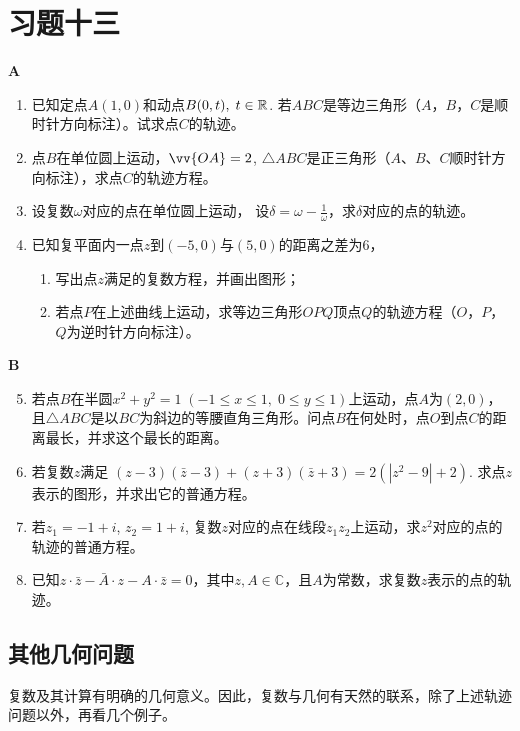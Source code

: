 \section*{习题十三}
\begin{center}
    \bfseries A
\end{center}
\begin{enumerate}
    \item 已知定点$A(1,0)$和动点$B(0,t),\; t\in\mathbb{R}$. 若$ABC$是等边三角形（$A$，$B$，$C$是顺时针方向标注）。试求点$C$的轨迹。
    \item 点$B$在单位圆上运动，$\vv{OA}=2$, $\triangle ABC$是正三角形（$A$、$B$、$C$顺时针方向标注），求点$C$的轨迹方程。
    \item 设复数$\omega$对应的点在单位圆上运动，
    设$\delta =\omega-\frac{1}{\omega}$，求$\delta$对应的点的轨迹。
   \item 已知复平面内一点$z$到$(-5,0)$与$(5,0)$的距离之差为6，
   \begin{enumerate}[(1)]
   \item 写出点$z$满足的复数方程，并画出图形；
   \item 若点$P$在上述曲线上运动，求等边三角形$OPQ$顶点$Q$的轨迹方程（$O$，$P$，$Q$为逆时针方向标注）。
   \end{enumerate}
\end{enumerate}


\begin{center}
    \bfseries B
\end{center}

\begin{enumerate}\setcounter{enumi}{4}
    \item 若点$B$在半圆$x^2+y^2=1\; (-1\le x\le 1,\; 0\le y\le 1)$上运动，点$A$为$(2,0)$，且$\triangle ABC$是以$BC$为斜边的等腰直角三角形。问点$B$在何处时，点$O$到点$C$的距离最长，并求这个最长的距离。
    \item 若复数$z$满足
    $(z-3)(\bar z-3)+(z+3)(\bar z+3)=2(|z^2-9|+2)$.
    求点$z$表示的图形，并求出它的普通方程。
    \item 若$z_1=-1+i$, $z_2=1+i$, 复数$z$对应的点在线段$z_1z_2$上运动，求$z^2$对应的点的轨迹的普通方程。
    \item 已知$z\cdot \bar z-\bar A\cdot z-A\cdot \bar z=0$，其中$z,A\in\mathbb{C}$，且$A$为常数，求复数$z$表示的点的轨迹。
\end{enumerate}

\subsection{其他几何问题}
    复数及其计算有明确的几何意义。因此，复数与几何有天然的联系，除了上述轨迹问题以外，再看几个例子。

